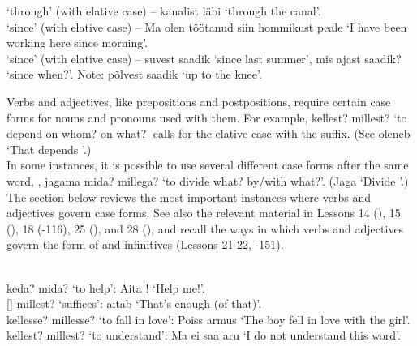  `through' (with elative case) -- kanalist läbi `through the canal'. \\

 `since' (with elative case) -- Ma olen töötanud siin hommikust peale `I have been working here since morning'. \\

 `since' (with elative case) -- suvest saadik `since last summer', mis ajast saadik? `since when?'. Note: põlvest saadik `up to the knee'.


\newSection Verbs and adjectives, like prepositions and postpositions, require certain case forms for nouns and pronouns used with them. For example,  kellest? millest? `to depend on whom? on what?' calls for the elative case with the  suffix. (See oleneb  `That depends '.) \\

In some instances, it is possible to use several different case forms after the same word, \eg, jagama mida? millega? `to divide what? by/with what?'. (Jaga  `Divide '.) \\

The section below reviews the most important instances where verbs and adjectives govern case forms. See also the relevant material in Lessons 14 (), 15 (), 18 (-116), 25 (), and 28 (), and recall the ways in which verbs and adjectives govern the form of  and  infinitives (Lessons 21-22, -151).

\newSection {} \\

 keda? mida? `to help': Aita ! `Help me!'. \\

 {\small []} millest? `suffices':  aitab `That's enough (of that)'. \\

 kellesse? millesse? `to fall in love': Poiss armus  `The boy fell in love with the girl'. \\

 kellest? millest? `to understand': Ma ei saa  aru `I do not understand this word'. \\

